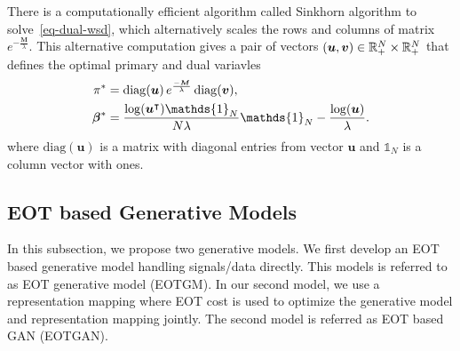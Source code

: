 There is a computationally efficient algorithm called Sinkhorn
algorithm\cite{2013arXiv1306.0895C, 2013arXiv1310.4375C} to
solve~\eqref{eq-dual-wsd}, which alternatively scales the rows and columns of matrix $e^{-\frac{\bm{M}}{\lambda}}$. This alternative computation gives a pair of vectors $(\bm{u}, \bm{v}) \in \mathbb{R}^N_{+} \times \mathbb{R}^N_{+}$ that defines the optimal primary and dual variavles \cite[Proposition~2]{2013arXiv1310.4375C} 
\begin{align}\label{eq-dual-opt}
  \pi^{\ast} &=
               \mathrm{diag}(\bm{u}) \, e^{\frac{-\bm{M}}{\la}} \, \mathrm{diag}(\bm{v}),  \nonumber \\
  \bm{\beta}^{\ast} &= \frac{\log(\bm{u}^{\intercal})\mathds{1}_N}{N\la} \mathds{1}_N -\frac{\log(\bm{u})}{\la}.
\end{align}
where $\mathrm{diag}(\bm{u})$ is a matrix with diagonal entries from vector $\bm{u}$ and $\mathds{1}_N$ is a column vector with ones.


\subsection{EOT based Generative Models}

In this subsection, we propose two generative models.
We first develop an EOT based generative model handling signals/data directly. This models is referred to as EOT generative model (EOTGM). 
In our second model, we use a
representation mapping where EOT cost is used to optimize the
generative model and representation mapping jointly. The second model is referred as EOT based GAN (EOTGAN).
\vspace{-3pt}
